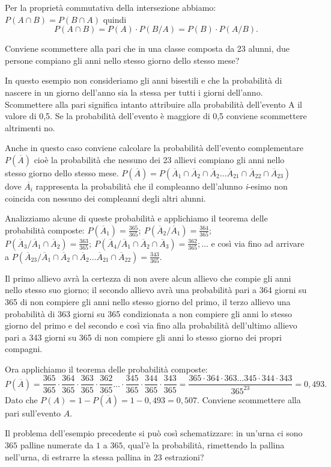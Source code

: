 Per la proprietà commutativa della intersezione abbiamo: $P(A\cap B)=P(B\cap A)$ quindi 
\[P(A\cap B)=P(A)\cdot P(B/A)=P(B)\cdot P(A/B).\]
\newpage
\begin{exrig}
\begin{esempio}
Conviene scommettere alla pari che in una classe composta da 23 alunni, due persone compiano gli anni nello stesso giorno dello stesso mese?

In questo esempio non consideriamo gli anni bisestili e che la probabilità di nascere in un giorno dell'anno sia la stessa per tutti i giorni dell'anno. Scommettere alla pari significa intanto attribuire alla probabilità dell'evento A il valore di 0,5. Se la probabilità dell'evento è maggiore di 0,5 conviene scommettere altrimenti no.

Anche in questo caso conviene calcolare la probabilità dell'evento complementare $P(\overline A)$ cioè la probabilità che nessuno dei 23 allievi compiano gli anni nello stesso giorno dello stesso mese. $P(\overline A)=P(\overline A_1\cap \overline A_2\cap \overline A_2\ldots \overline A_{21}\cap \overline A_{22}\cap \overline A_{23})$ dove $\overline{A_i}$ rappresenta la probabilità che il compleanno dell'alunno \emph{i}{}-esimo non coincida con nessuno dei compleanni degli altri alunni.

Analizziamo alcune di queste probabilità e applichiamo il teorema delle probabilità composte: $P(\overline A_1)=\frac{365}{365};\ P(\overline A_2/\overline A_1)=\frac{364}{365}$; $P(\overline A_3/\overline A_1\cap \overline A_2)=\frac{363}{365};\ P(\overline A_4/\overline A_1\cap \overline A_2\cap \overline A_3)=\frac{362}{365};\ldots $ e così via fino ad arrivare a $P(\overline A_{23}/\overline A_1\cap \overline A_2\cap \overline A_2\ldots \overline A_{21}\cap \overline A_{22})=\frac{343}{365}$.

Il primo allievo avrà la certezza di non avere alcun allievo che compie gli anni nello stesso suo giorno; il secondo allievo avrà una probabilità pari a 364 giorni su 365 di non compiere gli anni nello stesso giorno del primo, il terzo allievo una probabilità di 363 giorni su 365 condizionata a non compiere gli anni lo stesso giorno del primo e del secondo e così via fino alla probabilità dell'ultimo allievo pari a 343 giorni su 365 di non compiere gli anni lo stesso giorno dei propri compagni.

Ora applichiamo il teorema delle probabilità composte: \[ P(\overline A)=\frac{365}{365}\cdot \frac{364}{365}\cdot \frac{363}{365}\cdot \frac{362}{365}\ldots \cdot \frac{345}{365}\cdot \frac{344}{365}\cdot \frac{343}{365}=\frac{365\cdot 364\cdot 363\ldots 345 \cdot 344\cdot 343}{365^{23}}=0,493. \] Dato che $P(A)=1-P(\overline A)=1-0,493=0,507$.
\conclusione Conviene scommettere alla pari sull'evento $ A $.
\end{esempio}
\end{exrig}
Il problema dell'esempio precedente si può così schematizzare: in un'urna ci sono $ 365 $ palline numerate da $ 1 $ a $ 365 $, qual'è la probabilità, rimettendo la pallina nell'urna, di estrarre la stessa pallina in 23 estrazioni?

\vspazio{}
\newpage

